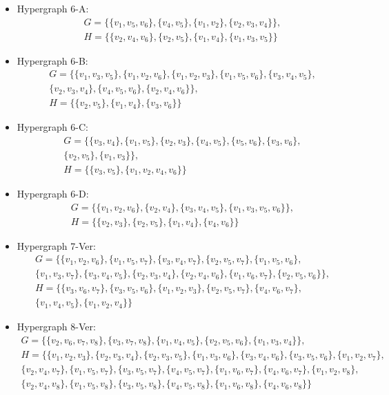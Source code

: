 \begin{itemize}
\item Hypergraph 6-A:
\begin{gather*}
G=\{\{v_1,v_5,v_6\},\{v_4,v_5\},\{v_1,v_2\},\{v_2,v_3,v_4\}\},\\[4pt]
H=\{\{v_2,v_4,v_6\},\{v_2,v_5\},\{v_1,v_4\},\{v_1,v_3,v_5\}\}
\end{gather*}
\item Hypergraph 6-B:
\begin{gather*}
G=\{\{v_1,v_3,v_5\},\{v_1,v_2,v_6\},\{v_1,v_2,v_3\},\{v_1,v_5,v_6\},\{v_3,v_4,v_5\},\\[4pt]
\{v_2,v_3,v_4\},\{v_4,v_5,v_6\},\{v_2,v_4,v_6\}\},\\[4pt]
H=\{\{v_2,v_5\},\{v_1,v_4\},\{v_3,v_6\}\}
\end{gather*}
\item Hypergraph 6-C:
\begin{gather*}
G=\{\{v_3,v_4\},\{v_1,v_5\},\{v_2,v_3\},\{v_4,v_5\},\{v_5,v_6\},\{v_3,v_6\},\\[4pt]
\{v_2,v_5\},\{v_1,v_3\}\},\\[4pt]
H=\{\{v_3,v_5\},\{v_1,v_2,v_4,v_6\}\}
\end{gather*}
\item Hypergraph 6-D:
\begin{gather*}
G=\{\{v_1,v_2,v_6\},\{v_2,v_4\},\{v_3,v_4,v_5\},\{v_1,v_3,v_5,v_6\}\},\\[4pt]
H=\{\{v_2,v_3\},\{v_2,v_5\},\{v_1,v_4\},\{v_4,v_6\}\}
\end{gather*}
\item Hypergraph 7-Ver:
\begin{gather*}
G=\{\{v_1,v_2,v_6\},\{v_1,v_5,v_7\},\{v_3,v_4,v_7\},\{v_2,v_5,v_7\},\{v_1,v_5,v_6\},\\[4pt]
\{v_1,v_3,v_7\},\{v_3,v_4,v_5\},\{v_2,v_3,v_4\},\{v_2,v_4,v_6\},\{v_1,v_6,v_7\},\{v_2,v_5,v_6\}\},\\[4pt]
H=\{\{v_3,v_6,v_7\},\{v_3,v_5,v_6\},\{v_1,v_2,v_3\},\{v_2,v_5,v_7\},\{v_4,v_6,v_7\},\\[4pt]
\{v_1,v_4,v_5\},\{v_1,v_2,v_4\}\}
\end{gather*}
\item Hypergraph 8-Ver:
\begin{gather*}
G=\{\{v_2,v_6,v_7,v_8\},\{v_3,v_7,v_8\},\{v_1,v_4,v_5\},\{v_2,v_5,v_6\},\{v_1,v_3,v_4\}\},\\[4pt]
H=\{\{v_1,v_2,v_3\},\{v_2,v_3,v_4\},\{v_2,v_3,v_5\},\{v_1,v_3,v_6\},\{v_3,v_4,v_6\},\{v_3,v_5,v_6\},\{v_1,v_2,v_7\},\\[4pt]
\{v_2,v_4,v_7\},\{v_1,v_5,v_7\},\{v_3,v_5,v_7\},\{v_4,v_5,v_7\},\{v_1,v_6,v_7\},\{v_4,v_6,v_7\},\{v_1,v_2,v_8\},\\[4pt]
\{v_2,v_4,v_8\},\{v_1,v_5,v_8\},\{v_3,v_5,v_8\},\{v_4,v_5,v_8\},\{v_1,v_6,v_8\},\{v_4,v_6,v_8\}\}
\end{gather*}
\end{itemize}

